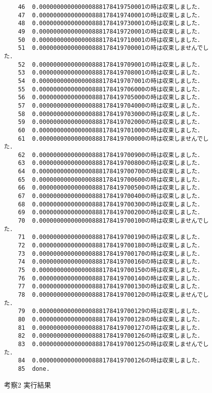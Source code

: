 \documentclass[12pt]{jarticle}
\renewcommand  \[  {\begin{eqnarray}}
\renewcommand  \]  {\end{eqnarray}}
\begin{document}
\begin{figure}[t]
\begin{screen}
\small
\begin{verbatim}
    46	0.000000000000000888178419750001の時は収束しました．
    47	0.000000000000000888178419740001の時は収束しました．
    48	0.000000000000000888178419730001の時は収束しました．
    49	0.000000000000000888178419720001の時は収束しました．
    50	0.000000000000000888178419710001の時は収束しました．
    51	0.000000000000000888178419700001の時は収束しませんでした．
    52	0.000000000000000888178419709001の時は収束しました．
    53	0.000000000000000888178419708001の時は収束しました．
    54	0.000000000000000888178419707001の時は収束しました．
    55	0.000000000000000888178419706000の時は収束しました．
    56	0.000000000000000888178419705000の時は収束しました．
    57	0.000000000000000888178419704000の時は収束しました．
    58	0.000000000000000888178419703000の時は収束しました．
    59	0.000000000000000888178419702000の時は収束しました．
    60	0.000000000000000888178419701000の時は収束しました．
    61	0.000000000000000888178419700000の時は収束しませんでした．
    62	0.000000000000000888178419700900の時は収束しました．
    63	0.000000000000000888178419700800の時は収束しました．
    64	0.000000000000000888178419700700の時は収束しました．
    65	0.000000000000000888178419700600の時は収束しました．
    66	0.000000000000000888178419700500の時は収束しました．
    67	0.000000000000000888178419700400の時は収束しました．
    68	0.000000000000000888178419700300の時は収束しました．
    69	0.000000000000000888178419700200の時は収束しました．
    70	0.000000000000000888178419700100の時は収束しませんでした．
    71	0.000000000000000888178419700190の時は収束しました．
    72	0.000000000000000888178419700180の時は収束しました．
    73	0.000000000000000888178419700170の時は収束しました．
    74	0.000000000000000888178419700160の時は収束しました．
    75	0.000000000000000888178419700150の時は収束しました．
    76	0.000000000000000888178419700140の時は収束しました．
    77	0.000000000000000888178419700130の時は収束しました．
    78	0.000000000000000888178419700120の時は収束しませんでした．
    79	0.000000000000000888178419700129の時は収束しました．
    80	0.000000000000000888178419700128の時は収束しました．
    81	0.000000000000000888178419700127の時は収束しました．
    82	0.000000000000000888178419700126の時は収束しました．
    83	0.000000000000000888178419700125の時は収束しませんでした．
    84	0.000000000000000888178419700126の時は収束しました．
    85	done.
\end{verbatim}
\end{screen}
\caption{考察2 実行結果}
\label{fig:4b}
\end{figure}
\end{document}
